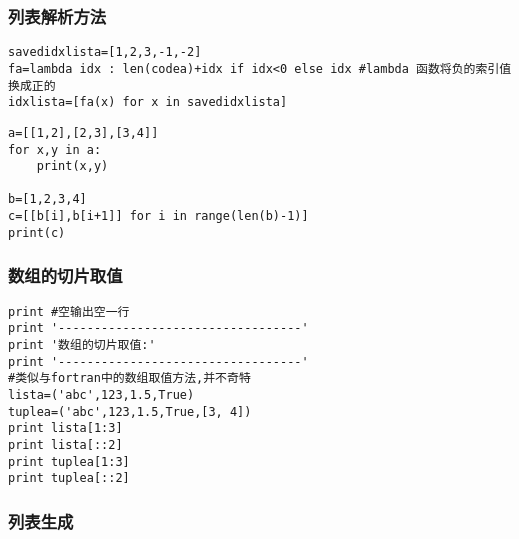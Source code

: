 \documentclass[twoside,11pt]{book}
\begin{document}
\subsubsection{列表解析方法}
\begin{lstlisting}
savedidxlista=[1,2,3,-1,-2]
fa=lambda idx : len(codea)+idx if idx<0 else idx #lambda 函数将负的索引值换成正的
idxlista=[fa(x) for x in savedidxlista]
\end{lstlisting}

\begin{lstlisting}
a=[[1,2],[2,3],[3,4]]
for x,y in a:
    print(x,y)

b=[1,2,3,4]
c=[[b[i],b[i+1]] for i in range(len(b)-1)]
print(c)
\end{lstlisting}



\subsubsection{数组的切片取值}

\begin{lstlisting}
print #空输出空一行
print '----------------------------------'
print '数组的切片取值:'
print '----------------------------------'
#类似与fortran中的数组取值方法,并不奇特
lista=('abc',123,1.5,True)
tuplea=('abc',123,1.5,True,[3, 4])
print lista[1:3]
print lista[::2]
print tuplea[1:3]
print tuplea[::2]
\end{lstlisting}

\subsubsection{列表生成}
\end{document}
